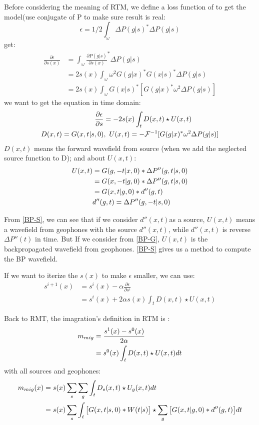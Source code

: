 \documentclass[a4paper]{article}
\begin{document}
	Before considering the meaning of RTM, we define a loss function of to get the model(use conjugate of P to make sure result is real:
	$$\epsilon=1/2 \int_{\omega}\Delta P(g|s)^* \Delta P(g|s) $$
	get:
	\begin{align}
		\frac{\partial \epsilon}{\partial s(x)}
		&=\int_{\omega}\frac{\partial P(g|s)}{\partial s(x)}^* \Delta P(g|s)\\
		&=2s(x)\int_{\omega}\omega^2G(g|x)^*G(x|s)^* \Delta P(g|s) \\
		&=2s(x)\int_{\omega}G(x|s)^* [G(g|x)^* \omega^2\Delta P(g|s)]
	\end{align}
	we want to get the equation in time domain:
	\begin{align}
		\frac{\partial \epsilon}{\partial s}
		&=-2s(x)\int_{t} D(x,t) \star U(x,t)\\
		D(x,t)=G(x,t|s,0)&,\ U(x,t)=-\mathcal{F}^{-1}[G(g|x)^* \omega^2\Delta P(g|s)] \notag
	\end{align}
	$D(x,t)$ means the forward wavefield from source (when we add the neglected source function to D); and about $U(x,t)$:
	\begin{align}
		U(x,t) 
		& = G(g,-t|x, 0) * \Delta P''(g,t|s,0) \notag\\
		& = G(x,-t|g, 0) * \Delta P''(g,t|s,0) \label{BP-G}\\
		& = G(x,t|g, 0) * d''(g,t)\label{BP-S}\\
		& d''(g,t)= \Delta P''(g,-t|s,0)\notag
	\end{align}

	From \autoref{BP-S}, we can see that if we consider $d''(x,t)$as a source, $U(x,t)$ means a wavefield from geophones with the source $d''(x,t)$, while $d''(x,t)$ is reverse $\Delta P''(t)$ in time. But If we consider from \autoref{BP-G}, $U(x,t)$ is the backpropagated wavefield from geophones. \autoref{BP-S} gives us a method to compute the BP wavefield.\par If we want to iterize the $s(x)$ to make $\epsilon$ smaller, we can use:
	\begin{align}
		s^{i+1}(x) &= s^i(x)-\alpha \frac{\partial \epsilon}{\partial s^i}\\
				   &= s^i(x)+2\alpha s(x)\int_{t} D(x,t) \star U(x,t)
	\end{align}
	$$$$
 
	Back to RMT, the imagration's definition in RTM is :
		\begin{align}
			m_{mig} &= \frac{s^{1}(x)-s^0(x)}{2\alpha} \notag\\
					&= s^0  	(x)\int_{t} D(x,t) \star U(x,t)dt
		\end{align}
	with all sources and geophones:
		\begin{align}
			m_{mig}(x) &= s(x)\sum_s \sum_g\int_{t} D_s(x,t) \star U_g (x,t)dt \notag\\
					   &= s(x)\sum_s \int_{t} \big[G(x,t|s,0)*W(t|s)\big] \star \sum_g \big[G(x,t|g, 0) * d''(g,t)\big]dt
		\end{align}\par
	
\end{document}
